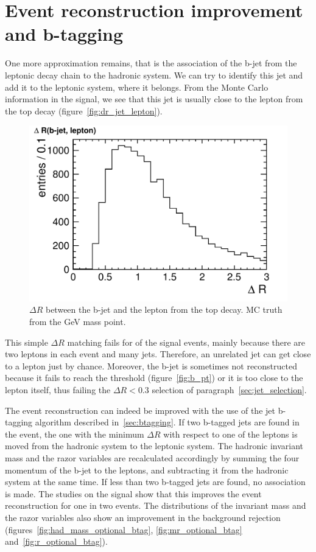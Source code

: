 \section{Event reconstruction improvement and
b-tagging}\label{sec:razor_btagging}
One more approximation remains, that is the association of the b-jet from the leptonic decay
chain to the hadronic system. We can try to identify this jet and add it to
the leptonic system, where it belongs.
From the Monte Carlo information in the signal, we see that this jet is
usually close to the lepton from the top decay
(figure~\ref{fig:dr_jet_lepton}).
\begin{figure}[h]
    \centering
    \includegraphics[height=.6\textwidth]{images/pdf/signal_mc_dr_jet_lepton}
    \caption{$\Delta R$ between the b-jet and the lepton from the top
        decay. MC truth from the \unit[550]{GeV} mass point.}
\end{figure}
This simple $\Delta R$ matching fails for  of the
signal events, mainly because there are two leptons in each event and many
jets. Therefore, an unrelated jet can get close to a lepton just by chance.
Moreover, the b-jet is sometimes not reconstructed because it fails to reach the \pt
threshold (figure~\ref{fig:b_pt}) or it is too close to the lepton itself,
thus failing the $\Delta R < 0.3$ selection of
paragraph~\ref{sec:jet_selection}.

The event reconstruction can indeed be improved with the use of the jet
b-tagging algorithm described in~\ref{sec:btagging}. If two b-tagged jets
are found in the event, the one with the minimum $\Delta R$ with respect to
one of the leptons is moved from the hadronic system to the leptonic system.
The hadronic invariant mass and the razor variables are recalculated
accordingly by summing the four momentum of the b-jet to the leptons, and
subtracting it from the hadronic system at the same time.
If less than two b-tagged jets are found, no association is made.
The studies on the signal show that this improves the event reconstruction
for one in two events. The distributions of the invariant mass and the razor
variables also show an improvement in the background rejection
(figures~\ref{fig:had_mass_optional_btag}, \ref{fig:mr_optional_btag}
and~\ref{fig:r_optional_btag}).

